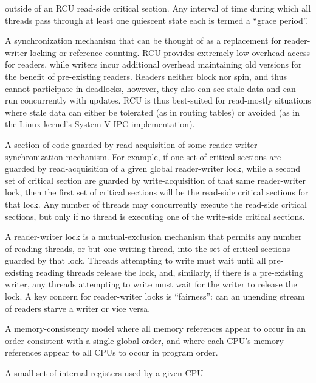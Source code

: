 \begin{description}
	outside of an RCU read-side critical section.
	Any interval of time during which all threads pass through at
	least one quiescent state each is termed a ``grace period''.
\item[Read-Copy Update (RCU):]
	A synchronization mechanism that can be thought of as a replacement
	for reader-writer locking or reference counting.
	RCU provides extremely low-overhead access for readers, while
	writers incur additional overhead maintaining old versions
	for the benefit of pre-existing readers.
	Readers neither block nor spin, and thus cannot participate in
	deadlocks, however, they also can see stale data and can
	run concurrently with updates.
	RCU is thus best-suited for read-mostly situations where
	stale data can either be tolerated (as in routing tables)
	or avoided (as in the Linux kernel's System V IPC implementation).
\item[\IXh{Read-Side Critical Section}{Critical section}{read-side}:]
	A section of code guarded by read-acquisition of
	some reader-writer synchronization mechanism.
	For example, if one set of critical sections are guarded by
	read-acquisition of
	a given global reader-writer lock, while a second set of critical
	section are guarded by write-acquisition of that same reader-writer
	lock, then the first set of critical sections will be the
	read-side critical sections for that lock.
	Any number of threads may concurrently execute the read-side
	critical sections, but only if no thread is executing one of
	the write-side critical sections.
\item[\IXh{Reader-Writer Lock}{Lock}{reader-writer}:]
	A reader-writer lock is a mutual-exclusion mechanism that
	permits any number of reading
	threads, or but one writing thread, into the set of critical
	sections guarded by that lock.
	Threads attempting to write must wait until all pre-existing
	reading threads release the lock, and, similarly, if there
	is a pre-existing writer, any threads attempting to write must
	wait for the writer to release the lock.
	A key concern for reader-writer locks is ``fairness'':
	can an unending stream of readers starve a writer or vice versa.
\item[Sequential Consistency:]
	A memory-consistency model where all memory references appear to occur
	in an order consistent with
	a single global order, and where each CPU's memory references
	appear to all CPUs to occur in program order.
\item[Store Buffer:]
	A small set of internal registers used by a given CPU

\end{description}
